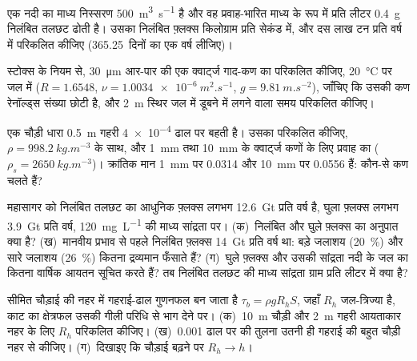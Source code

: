 \begin{exercise}[$\star$]
\label{exo:b1:erosion-transport:1}
एक नदी का माध्य निस्सरण \qty{500}{m^3.s^{-1}} है और वह प्रवाह-भारित माध्य के रूप में प्रति लीटर \qty{0.4}{g} निलंबित तलछट ढोती है। उसका निलंबित फ़्लक्स किलोग्राम प्रति सेकंड में, और दस लाख टन प्रति वर्ष में परिकलित कीजिए (\num{365.25}~दिनों का एक वर्ष लीजिए)।
\end{exercise}

\begin{exercise}[$\star$]
\label{exo:b1:erosion-transport:2}
स्टोक्स के नियम से, \qty{30}{\micro m} आर-पार की एक क्वार्ट्ज गाद-कण का  परिकलित कीजिए, \qty{20}{\celsius} पर जल में ($R = 1.6548$, $\nu =
\qty{1.0034e-6}{m^2.s^{-1}}$, $g = \qty{9.81}{m.s^{-2}}$), जाँचिए कि उसकी कण रेनॉल्ड्स संख्या छोटी है, और \qty{2}{m} स्थिर जल में डूबने में लगने वाला समय परिकलित कीजिए।
\end{exercise}

\begin{exercise}[$\star$]
\label{exo:b1:erosion-transport:3}
एक चौड़ी धारा \qty{0.5}{m} गहरी \num{4e-4} ढाल पर बहती है। उसका  परिकलित कीजिए, $\rho = \qty{998.2}{kg.m^{-3}}$ के साथ, और \qty{1}{mm} तथा \qty{10}{mm} के क्वार्ट्ज कणों के लिए प्रवाह का  ($\rho_s = \qty{2650}{kg.m^{-3}}$)। क्रांतिक मान \qty{1}{mm} पर \num{0.0314} और \qty{10}{mm} पर \num{0.0556} हैं: कौन-से कण चलते हैं?
\end{exercise}

\begin{exercise}[$\star$]
\label{exo:b1:erosion-transport:4}
महासागर को निलंबित तलछट का आधुनिक फ़्लक्स लगभग \qty{12.6}{Gt} प्रति वर्ष है, घुला फ़्लक्स लगभग \qty{3.9}{Gt} प्रति वर्ष, \qty{120}{mg.L^{-1}} की माध्य सांद्रता पर। (क)~निलंबित और घुले फ़्लक्स का अनुपात क्या है? (ख)~मानवीय प्रभाव से पहले निलंबित फ़्लक्स \qty{14}{Gt} प्रति वर्ष था: बड़े जलाशय (\qty{20}{\percent}) और सारे जलाशय (\qty{26}{\percent}) कितना द्रव्यमान फँसाते हैं? (ग)~घुले फ़्लक्स और उसकी सांद्रता नदी के जल का कितना वार्षिक आयतन सूचित करते हैं? तब निलंबित तलछट की माध्य सांद्रता ग्राम प्रति लीटर में क्या है?
\end{exercise}

\begin{exercise}[$\star\star$]
\label{exo:b1:erosion-transport:5}
सीमित चौड़ाई की नहर में गहराई-ढाल गुणनफल बन जाता है $\tau_b =
\rho g R_h S$, जहाँ $R_h$ जल-त्रिज्या है, काट का क्षेत्रफल उसकी गीली परिधि से भाग देने पर। (क)~\qty{10}{m} चौड़ी और \qty{2}{m} गहरी आयताकार नहर के लिए $R_h$ परिकलित कीजिए। (ख)~\num{0.001} ढाल पर  की तुलना उतनी ही गहराई की बहुत चौड़ी नहर से कीजिए। (ग)~दिखाइए कि चौड़ाई बढ़ने पर $R_h \to h$।
\end{exercise}

